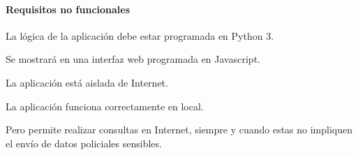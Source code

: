  \paragraph{Requisitos no funcionales}
  
  \begin{nonfunctional}
    \item La lógica de la aplicación debe estar programada en Python 3.
    \item Se mostrará en una interfaz web programada en Javascript.
    
    \item La aplicación está aislada de Internet.
    \begin{nonfunctional}
      \item La aplicación funciona correctamente en local.
      \item Pero permite realizar consultas en Internet, siempre y cuando estas no impliquen el envío de datos policiales sensibles.
    \end{nonfunctional}
  \end{nonfunctional}